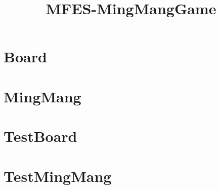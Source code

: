 \documentclass{article}
\begin{document}
\title{MFES-MingMangGame}
\author{}
\maketitle
\tableofcontents

\section{Board}

\section{MingMang}

\section{TestBoard}

\section{TestMingMang}

\end{document}
